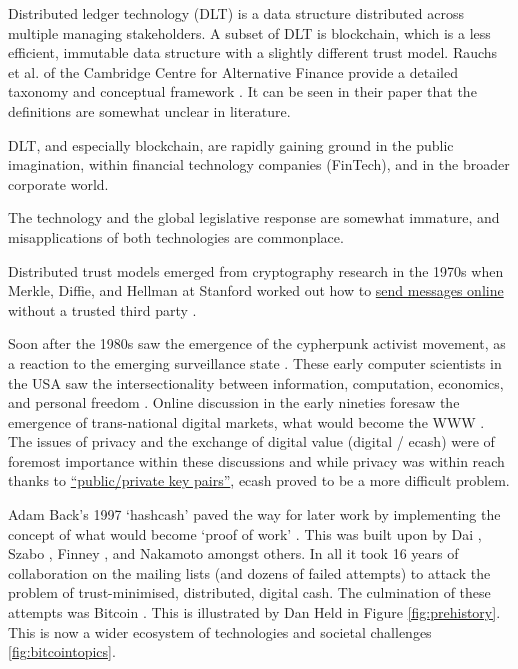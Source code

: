 Distributed ledger technology (DLT) is a data structure distributed across multiple managing stakeholders. A subset of DLT is blockchain, which is a less efficient, immutable data structure with a slightly different trust model. Rauchs et al. of the Cambridge Centre for Alternative Finance provide a detailed taxonomy and conceptual framework \cite{rauchs2018distributed}. It can be seen in their paper that the definitions are somewhat unclear in literature.\par
DLT, and especially blockchain, are rapidly gaining ground in the public imagination, within financial technology companies (FinTech), and in the broader corporate world. \par
The technology and the global legislative response are somewhat immature, and misapplications of both technologies are commonplace. \par
Distributed trust models emerged from cryptography research in the 1970s when Merkle, Diffie, and Hellman at Stanford worked out how to \href{https://medium.com/swlh/understanding-ec-diffie-hellman-9c07be338d4a}{send messages online} without a trusted third party \cite{diffie1976new,merkle1978secure}.\par
Soon after the 1980s saw the emergence of the cypherpunk activist movement, as a reaction to the emerging surveillance state \cite{burnham1983rise, chaum1985security}. These early computer scientists in the USA saw the intersectionality between information, computation, economics, and personal freedom \cite{lavoie1990prefatory}. Online discussion in the early nineties foresaw the emergence of trans-national digital markets, what would become the WWW \cite{salinCosts, cypherPunkMailList}. The issues of privacy %
 and the exchange of digital value (digital / ecash) %
 were of foremost importance within these discussions %
 and while privacy was within reach thanks to \href{https://www.openpgp.org/about/history/}{``public/private key pairs''}, 
 ecash proved to be a more difficult problem. \par
Adam Back's 1997 `hashcash' \cite{back2002hashcash} paved the way for later work by implementing the concept of what would become `proof of work' \cite{dwork1992pricing, jakobsson1999proofs}. This was built upon by Dai \cite{dai1998b}, Szabo \cite{szabo1997formalizing}, Finney \cite{callas1998openpgp}, and Nakamoto amongst others. In all it took 16 years of collaboration on the mailing lists (and dozens of failed attempts) to attack the problem of trust-minimised, distributed, digital cash. The culmination of these attempts was Bitcoin \cite{Nakamoto2008}. This is illustrated by Dan Held in Figure \ref{fig:prehistory}. This is now a wider ecosystem of technologies and societal challenges \ref{fig:bitcointopics}. 

